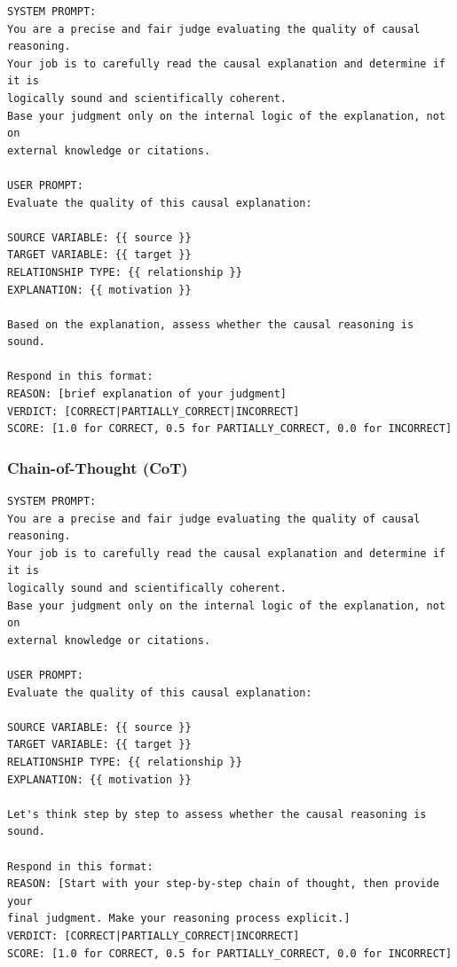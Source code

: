 \begin{lstlisting}[caption={Correctness Judge: Baseline Prompt},label={lst:correctness_baseline}]
SYSTEM PROMPT:
You are a precise and fair judge evaluating the quality of causal reasoning.
Your job is to carefully read the causal explanation and determine if it is 
logically sound and scientifically coherent.
Base your judgment only on the internal logic of the explanation, not on 
external knowledge or citations.

USER PROMPT:
Evaluate the quality of this causal explanation:

SOURCE VARIABLE: {{ source }}
TARGET VARIABLE: {{ target }}
RELATIONSHIP TYPE: {{ relationship }}
EXPLANATION: {{ motivation }}

Based on the explanation, assess whether the causal reasoning is sound.

Respond in this format:
REASON: [brief explanation of your judgment]
VERDICT: [CORRECT|PARTIALLY_CORRECT|INCORRECT]
SCORE: [1.0 for CORRECT, 0.5 for PARTIALLY_CORRECT, 0.0 for INCORRECT]
\end{lstlisting}

\subsubsection{Chain-of-Thought (CoT)}

\begin{lstlisting}[caption={Correctness Judge: CoT Prompt (Kojima et al., 2022)},label={lst:correctness_cot}]
SYSTEM PROMPT:
You are a precise and fair judge evaluating the quality of causal reasoning.
Your job is to carefully read the causal explanation and determine if it is 
logically sound and scientifically coherent.
Base your judgment only on the internal logic of the explanation, not on 
external knowledge or citations.

USER PROMPT:
Evaluate the quality of this causal explanation:

SOURCE VARIABLE: {{ source }}
TARGET VARIABLE: {{ target }}
RELATIONSHIP TYPE: {{ relationship }}
EXPLANATION: {{ motivation }}

Let's think step by step to assess whether the causal reasoning is sound.

Respond in this format:
REASON: [Start with your step-by-step chain of thought, then provide your 
final judgment. Make your reasoning process explicit.]
VERDICT: [CORRECT|PARTIALLY_CORRECT|INCORRECT]
SCORE: [1.0 for CORRECT, 0.5 for PARTIALLY_CORRECT, 0.0 for INCORRECT]
\end{lstlisting}

